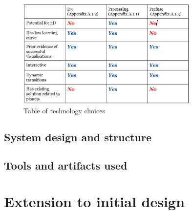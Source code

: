 \clearpage
\begin{figure}[h!]
  \centering
      \includegraphics[width=0.8\textwidth]{images/table_technologies.jpg}
  \caption{Table of technology choices}
\end{figure}


\subsection{System design and structure}

\subsection{Tools and artifacts used}
\section{Extension to initial design}


